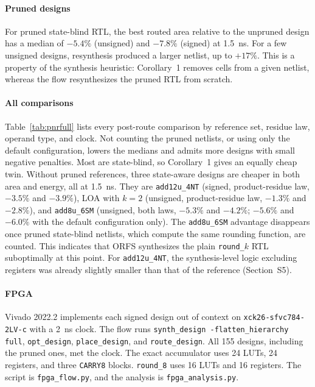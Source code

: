 \documentclass[11pt]{article}
\begin{document}
\paragraph{Pruned designs}
For pruned state-blind RTL, the best routed area relative to the
unpruned design has a median of $-5.4\%$ (unsigned) and $-7.8\%$
(signed) at 1.5~ns. For a few unsigned designs, resynthesis produced
a larger netlist, up to $+17\%$. This is a property of the synthesis
heuristic: Corollary~1 removes cells from a given netlist, whereas the
flow resynthesizes the pruned RTL from scratch.

\paragraph{All comparisons}
Table~\ref{tab:pnrfull} lists every post-route comparison by reference
set, residue law, operand type, and clock. Not counting the pruned
netlists, or using only the default configuration, lowers the medians and
admits more designs with small negative penalties. Most are state-blind,
so Corollary~1 gives an equally cheap twin. Without pruned references,
three state-aware designs are cheaper in both area and energy, all at
1.5~ns. They are \texttt{add12u\_4NT} (signed, product-residue law, $-3.5\%$ and
$-3.9\%$), LOA with $k=2$ (unsigned, product-residue law, $-1.3\%$ and $-2.8\%$),
and \texttt{add8u\_6SM} (unsigned, both laws, $-5.3\%$ and $-4.2\%$; $-5.6\%$
and $-6.0\%$ with the default configuration only). The \texttt{add8u\_6SM}
advantage disappears once pruned state-blind netlists, which compute
the same rounding function, are counted. This indicates that ORFS
synthesizes the plain \texttt{round\_$k$} RTL suboptimally at this point.
For \texttt{add12u\_4NT}, the synthesis-level logic excluding registers was
already slightly smaller than that of the reference (Section~S5).



\paragraph{FPGA}
Vivado 2022.2 implements each signed design out of context on
\texttt{xck26-sfvc784-2LV-c} with a 2~ns clock. The flow runs
\texttt{synth\_design -flatten\_hierarchy full}, \texttt{opt\_design},
\texttt{place\_design}, and \texttt{route\_design}. All 155 designs,
including the pruned ones, met the clock. The exact accumulator uses 24
LUTs, 24 registers, and three \texttt{CARRY8} blocks. \texttt{round\_8}
uses 16 LUTs and 16 registers. The script is \texttt{fpga\_flow.py}, and the
analysis is \texttt{fpga\_analysis.py}.
\end{document}
